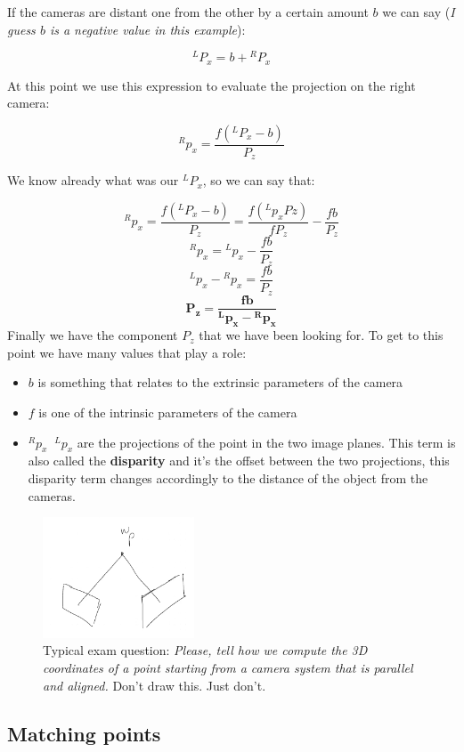 If the cameras are distant one from the other by a certain amount \(b\) we can say (\textit{I guess \(b\) is a negative value in this example}):

\[
    {}^LP_x = b+{}^RP_x
\]

At this point we use this expression to evaluate the projection on the right camera:

\[
    {}^Rp_x = \frac{f({}^LP_x-b)}{P_z}    
\]

We know already what was our \({}^LP_x\), so we can say that: 

\[
    {}^Rp_x = \frac{f({}^LP_x-b)}{P_z}    
    =
    \frac{f({}^Lp_xPz)}{fP_z}-\frac{fb}{P_z}
\]
\[
    {}^Rp_x ={}^Lp_x-\frac{fb}{P_z}
\]
\[
    {}^Lp_x- {}^Rp_x = \frac{fb}{P_z}
\]
\[
    \bm{{P_z} = \frac{fb}{{}^Lp_x- {}^Rp_x}}
\]
Finally we have the component \(P_z\) that we have been looking for. To get to this point we have many values that play a role:
\begin{itemize}
    \item \(b\) is something that relates to the extrinsic parameters of the camera
    \item \(f\) is one of the intrinsic parameters of the camera
    \item \({}^Rp_x \;\; {}^Lp_x\) are the projections of the point in the two image planes. This term is also called the \textbf{disparity} and it's the offset between the two projections, this disparity term changes accordingly to the distance of the object from the cameras.
\end{itemize}

\begin{figure}[H]
    \centering
    \includegraphics[width=0.4\textwidth]{Figures/mistake.png}
    \caption{Typical exam question: \textit{Please, tell how we compute the 3D coordinates of a point starting from a camera system that is parallel and aligned.} Don't draw this. Just don't.}
    \label{fig:mistake}
\end{figure}

\subsection{Matching points}

